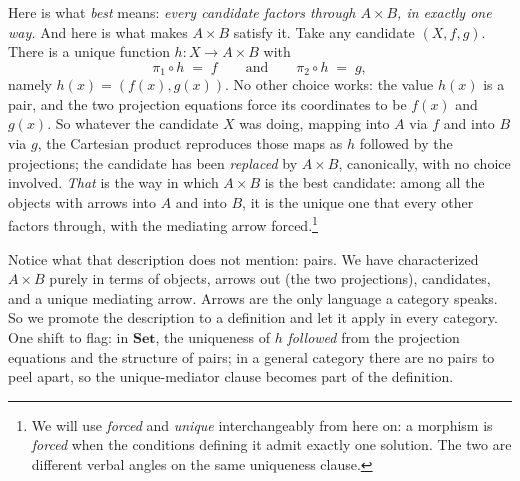 \noindent Here is what \textit{best} means: \textit{every candidate
factors through $A \times B$, in exactly one way.} And here is what
makes $A \times B$ satisfy it. Take any candidate $(X, f, g)$. There is a
unique function $h : X \to A \times B$ with
\[ \pi_1 \circ h \; = \; f \qquad \text{and} \qquad \pi_2 \circ h \; = \;
g, \]
namely $h(x) = (f(x), g(x))$. No other choice works: the value $h(x)$ is
a pair, and the two projection equations force its coordinates to be
$f(x)$ and $g(x)$. So whatever the candidate $X$ was doing, mapping into
$A$ via $f$ and into $B$ via $g$, the Cartesian product reproduces those
maps as $h$ followed by the projections; the candidate has been
\textit{replaced} by $A \times B$, canonically, with no choice involved.
\textit{That} is the way in which $A \times B$ is the best candidate:
among all the objects with arrows into $A$ and into $B$, it is the
unique one that every other factors through, with the mediating arrow
forced.\footnote{We will use \textit{forced} and \textit{unique}
interchangeably from here on: a morphism is \textit{forced} when the
conditions defining it admit exactly one solution. The two are different
verbal angles on the same uniqueness clause.}

\noindent Notice what that description does not mention: pairs. We have
characterized $A \times B$ purely in terms of objects, arrows out (the two
projections), candidates, and a unique mediating arrow. Arrows are the
only language a category speaks. So we promote the description to a
definition and let it apply in every category. One shift to flag: in
$\mathbf{Set}$, the uniqueness of $h$ \textit{followed} from the
projection equations and the structure of pairs; in a general category
there are no pairs to peel apart, so the unique-mediator clause becomes
part of the definition.

